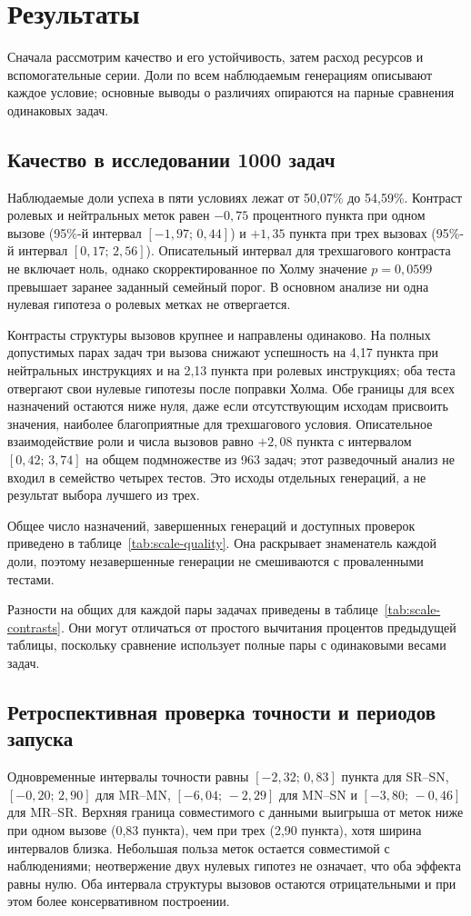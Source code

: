 \FloatBarrier
\section{Результаты}\label{sec:results}
Сначала рассмотрим качество и его устойчивость, затем расход ресурсов и вспомогательные серии. Доли по всем наблюдаемым генерациям описывают каждое условие; основные выводы о различиях опираются на парные сравнения одинаковых задач.
\subsection{Качество в исследовании 1000 задач}
Наблюдаемые доли успеха в пяти условиях лежат от 50,07\% до 54,59\%. Контраст ролевых и нейтральных меток равен $-0{,}75$ процентного пункта при одном вызове (95\%-й интервал $[-1{,}97;\,0{,}44]$) и $+1{,}35$ пункта при трех вызовах (95\%-й интервал $[0{,}17;\,2{,}56]$). Описательный интервал для трехшагового контраста не включает ноль, однако скорректированное по Холму значение $p=0{,}0599$ превышает заранее заданный семейный порог. В основном анализе ни одна нулевая гипотеза о ролевых метках не отвергается.

Контрасты структуры вызовов крупнее и направлены одинаково. На полных допустимых парах задач три вызова снижают успешность на 4,17 пункта при нейтральных инструкциях и на 2,13 пункта при ролевых инструкциях; оба теста отвергают свои нулевые гипотезы после поправки Холма. Обе границы для всех назначений остаются ниже нуля, даже если отсутствующим исходам присвоить значения, наиболее благоприятные для трехшагового условия. Описательное взаимодействие роли и числа вызовов равно $+2{,}08$ пункта с интервалом $[0{,}42;\,3{,}74]$ на общем подмножестве из 963 задач; этот разведочный анализ не входил в семейство четырех тестов. Это исходы отдельных генераций, а не результат выбора лучшего из трех.

Общее число назначений, завершенных генераций и доступных проверок приведено в таблице~\ref{tab:scale-quality}. Она раскрывает знаменатель каждой доли, поэтому незавершенные генерации не смешиваются с проваленными тестами.

Разности на общих для каждой пары задачах приведены в таблице~\ref{tab:scale-contrasts}. Они могут отличаться от простого вычитания процентов предыдущей таблицы, поскольку сравнение использует полные пары с одинаковыми весами задач.


\subsection{Ретроспективная проверка точности и периодов запуска}
Одновременные интервалы точности равны $[-2{,}32;\,0{,}83]$ пункта для SR--SN, $[-0{,}20;\,2{,}90]$ для MR--MN, $[-6{,}04;\,-2{,}29]$ для MN--SN и $[-3{,}80;\,-0{,}46]$ для MR--SR. Верхняя граница совместимого с данными выигрыша от меток ниже при одном вызове (0,83 пункта), чем при трех (2,90 пункта), хотя ширина интервалов близка. Небольшая польза меток остается совместимой с наблюдениями; неотвержение двух нулевых гипотез не означает, что оба эффекта равны нулю. Оба интервала структуры вызовов остаются отрицательными и при этом более консервативном построении.

